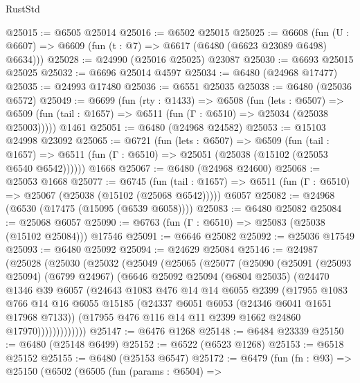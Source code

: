 \begin{lexlean}{RustStd}
\begin{coremodule}
@25015 := @6505 @25014
@25016 := @6502 @25015
@25025 := @6608
    (fun (U : @6607) => @6609 (fun (t : @7) => @6617 (@6480 (@6623 @23089 @6498) @6634)))
@25028 := @24990 (@25016 @25025) @23087
@25030 := @6693 @25015 @25025
@25032 := @6696 @25014 @4597
@25034 := @6480 (@24968 @17477)
@25035 := @24993 @17480
@25036 := @6551 @25035
@25038 := @6480 (@25036 @6572)
@25049 := @6699
    (fun (rty : @1433) =>
    @6508
      (fun (lets : @6507) =>
      @6509 (fun (tail : @1657) => @6511 (fun (Γ : @6510) => @25034 (@25038 @25003)))))
    @1461
@25051 := @6480 (@24968 @24582)
@25053 := @15103 @24998 @23092
@25065 := @6721
    (fun (lets : @6507) =>
    @6509
      (fun (tail : @1657) =>
      @6511 (fun (Γ : @6510) => @25051 (@25038 (@15102 (@25053 @6540 @6542))))))
    @1668
@25067 := @6480 (@24968 @24600)
@25068 := @25053 @1668
@25077 := @6745
    (fun (tail : @1657) => @6511 (fun (Γ : @6510) => @25067 (@25038 (@15102 (@25068 @6542)))))
    @6057
@25082 := @24968 (@6530 (@17475 (@15095 (@6539 @6058))))
@25083 := @6480 @25082
@25084 := @25068 @6057
@25090 := @6763 (fun (Γ : @6510) => @25083 (@25038 (@15102 @25084))) @17546
@25091 := @6646 @25082
@25092 := @25036 @17549
@25093 := @6480 @25092
@25094 := @24629 @25084
@25146 := @24987
    (@25028
      (@25030
        (@25032
          (@25049
            (@25065
              (@25077
                (@25090
                  (@25091
                    (@25093 @25094)
                    (@6799 @24967)
                    (@6646
                      @25092
                      @25094
                      (@6804 @25035)
                      (@24470
                        @1346
                        @39
                        @6057
                        (@24643
                          @1083
                          @476
                          @14
                          @14
                          @6055
                          @2399
                          (@17955
                            @1083
                            @766
                            @14
                            @16
                            @6055
                            @15185
                            (@24337 @6051 @6053 (@24346 @6041 @1651 @17968 @7133))
                            (@17955 @476 @116 @14 @11 @2399 @1662 @24860 @17970)))))))))))))
@25147 := @6476 @1268
@25148 := @6484 @23339
@25150 := @6480 (@25148 @6499)
@25152 := @6522 (@6523 @1268)
@25153 := @6518 @25152
@25155 := @6480 (@25153 @6547)
@25172 := @6479
    (fun (fn : @93) =>
    @25150
      (@6502
        (@6505
          (fun (params : @6504) =>

\end{coremodule}
\end{lexlean}
